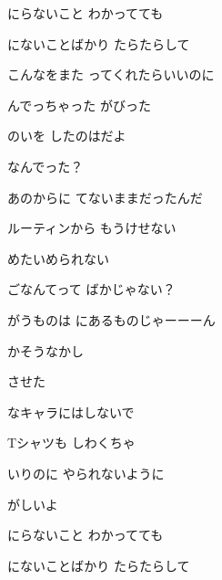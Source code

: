 \documentclass[a4paper,tate,twocolumn,12pt]{ltjtarticle}
\begin{document}
\begin{flushleft}
\begin{minipage}{\linewidth}
にらないこと わかってても

にないことばかり たらたらして

こんなをまた ってくれたらいいのに
\end{minipage}

\vspace{2em}

\noindent\begin{minipage}{\linewidth}
んでっちゃった がびった

のいを したのはだよ

なんでった？

あのからに てないままだったんだ
\end{minipage}

\vspace{2em}

\noindent\begin{minipage}{\linewidth}
ルーティンから もうけせない

めたいめられない 

ごなんてって ばかじゃない？

がうものは にあるものじゃーーーん
\end{minipage}

\vspace{2em}

\noindent\begin{minipage}{\linewidth}
かそうなかし

させた

なキャラにはしないで

Tシャツも しわくちゃ

いりのに やられないように

がしいよ 

にらないこと わかってても

にないことばかり たらたらして


\end{minipage}
\end{flushleft}
\end{document}
